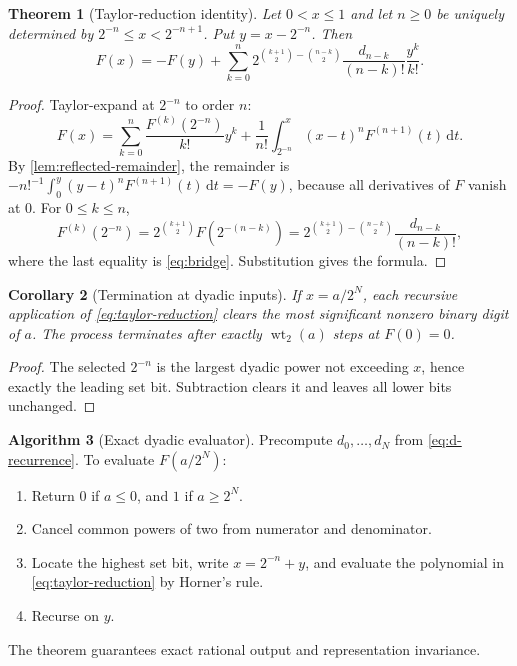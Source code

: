 \documentclass[11pt]{article}
\newtheorem{theorem}{Theorem}[section]
\newtheorem{corollary}[theorem]{Corollary}
\theoremstyle{definition}
\newtheorem{algorithm}[theorem]{Algorithm}
\theoremstyle{remark}
\newcommand{\wt}{\operatorname{wt}_2}\newcommand{\upfun}{\operatorname{up}}
\newcommand{\dd}{\,\mathrm d}\newcommand{\e}{\mathrm e}\newcommand{\ii}{\mathrm i}
\begin{document}
\begin{theorem}[Taylor-reduction identity]\label{thm:taylor-reduction}
Let $0<x\le1$ and let $n\ge0$ be uniquely determined by
$2^{-n}\le x<2^{-n+1}$.  Put $y=x-2^{-n}$.  Then
\begin{equation}\label{eq:taylor-reduction}
\boxed{
 F(x)=-F(y)+\sum_{k=0}^{n}
 2^{\binom{k+1}{2}-\binom{n-k}{2}}
 \frac{d_{n-k}}{(n-k)!}\frac{y^k}{k!}.}
\end{equation}
\end{theorem}
\begin{proof}
Taylor-expand at $2^{-n}$ to order $n$:
\[
 F(x)=\sum_{k=0}^{n}\frac{F^{(k)}(2^{-n})}{k!}y^k
 +\frac1{n!}\int_{2^{-n}}^{x}(x-t)^nF^{(n+1)}(t)\dd t.
\]
By \cref{lem:reflected-remainder}, the remainder is
$-n!^{-1}\int_0^y(y-t)^nF^{(n+1)}(t)\dd t=-F(y)$, because all derivatives of $F$ vanish at $0$.  For $0\le k\le n$,
\[
 F^{(k)}(2^{-n})=2^{\binom{k+1}{2}}F(2^{-(n-k)})
 =2^{\binom{k+1}{2}-\binom{n-k}{2}}
 \frac{d_{n-k}}{(n-k)!},
\]
where the last equality is \eqref{eq:bridge}.  Substitution gives the formula.
\end{proof}

\begin{corollary}[Termination at dyadic inputs]\label{cor:bit-clearing}
If $x=a/2^N$, each recursive application of \eqref{eq:taylor-reduction} clears the most significant nonzero binary digit of $a$.  The process terminates after exactly $\wt(a)$ steps at $F(0)=0$.
\end{corollary}
\begin{proof}
The selected $2^{-n}$ is the largest dyadic power not exceeding $x$, hence exactly the leading set bit.  Subtraction clears it and leaves all lower bits unchanged.
\end{proof}

\begin{algorithm}[Exact dyadic evaluator]\label{alg:evaluator}
Precompute $d_0,\ldots,d_N$ from \eqref{eq:d-recurrence}.  To evaluate $F(a/2^N)$:
\begin{enumerate}[label=\arabic*.]
\item Return $0$ if $a\le0$, and $1$ if $a\ge2^N$.
\item Cancel common powers of two from numerator and denominator.
\item Locate the highest set bit, write $x=2^{-n}+y$, and evaluate the polynomial in \eqref{eq:taylor-reduction} by Horner's rule.
\item Recurse on $y$.
\end{enumerate}
The theorem guarantees exact rational output and representation invariance.
\end{algorithm}
\end{document}
